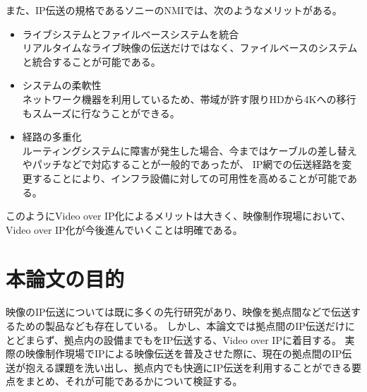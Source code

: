 \newpage
また、IP伝送の規格であるソニーのNMI\cite{sony-nmi}では、次のようなメリットがある。
\begin{itemize}
  \item ライブシステムとファイルベースシステムを統合\mbox{}\\
    リアルタイムなライブ映像の伝送だけではなく、ファイルベースのシステムと統合することが可能である。
  \item システムの柔軟性\mbox{}\\
    ネットワーク機器を利用しているため、帯域が許す限りHDから4Kへの移行もスムーズに行なうことができる。
  \item 経路の多重化\mbox{}\\
    ルーティングシステムに障害が発生した場合、今まではケーブルの差し替えやパッチなどで対応することが一般的であったが、
    IP網での伝送経路を変更することにより、インフラ設備に対しての可用性を高めることが可能である。
\end{itemize}

このようにVideo over IP化によるメリットは大きく、映像制作現場において、Video over IP化が今後進んでいくことは明確である。

\section{本論文の目的}
映像のIP伝送については既に多くの先行研究があり、映像を拠点間などで伝送するための製品なども存在している。
しかし、本論文では拠点間のIP伝送だけにとどまらず、拠点内の設備までもをIP伝送する、Video over IPに着目する。
実際の映像制作現場でIPによる映像伝送を普及させた際に、現在の拠点間のIP伝送が抱える課題を洗い出し、拠点内でも快適にIP伝送を利用することができる要点をまとめ、それが可能であるかについて検証する。

